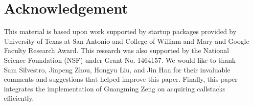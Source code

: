 \section*{Acknowledgement}

This material is based upon work supported by %
startup packages provided by University of Texas at San Antonio and College of William and Mary and Google Faculty Research Award. This research was also supported by the National Science Foundation (NSF) under Grant No. 1464157. We would like to thank Sam Silvestro, Jinpeng Zhou, Hongyu Liu, and Jin Han for their invaluable comments and suggestions that helped improve this paper. Finally, this paper integrates the implementation of Guangming Zeng on acquiring callstacks efficiently.